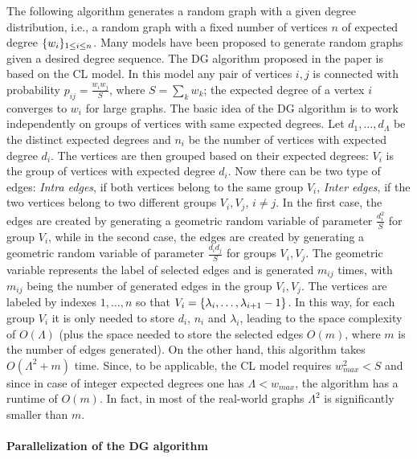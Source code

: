 \documentclass[a4paper,11pt]{article}
\theoremstyle{definition}
\theoremstyle{plain}
\theoremstyle{remark}
\DeclarePairedDelimiter{\bra}{\lbrace}{\rbrace}
\begin{document}
The following algorithm generates a random graph with a given degree distribution, i.e., a random graph with a fixed number of vertices $n$ of expected degree $\bra{w_i}_{1\leq i\leq n}$. Many models have been proposed to generate random graphs given a desired degree sequence. The DG algorithm proposed in the paper \cite{alam:random} is based on the CL model. In this model any pair of vertices $i,j$ is connected with probability $p_{ij}=\frac{w_iw_j}{S}$, where $S=\sum_kw_k$; the expected degree of a vertex $i$ converges to $w_i$ for large graphs.
The basic idea of the DG algorithm is to work independently on groups of vertices with same expected degrees. Let $d_1,\dots,d_\Lambda$ be the distinct expected degrees and $n_i$ be the number of vertices with expected degree $d_i$. The vertices are then grouped based on their expected degrees: $V_i$ is the group of vertices with expected degree $d_i$. Now there can be two type of edges: \emph{Intra edges}, if both vertices belong to the same group $V_i$, \emph{Inter edges}, if the two vertices belong to two different groups $V_i,V_j$, $i\neq j$.  
In the first case, the edges are created by generating a geometric random variable of parameter $\frac{d_i^2}{S}$ for group $V_i$, while in the second case, the edges are created by generating a geometric random variable of parameter $\frac{d_id_j}{S}$ for groups $V_i, V_j$. The geometric variable represents the label of selected edges and is generated $m_{ij}$ times, with $m_{ij}$ being the number of generated edges in the group $V_i, V_j$. The vertices are labeled by indexes $1,\dots,n$ so that $V_i=\bra{\lambda_i,\dots,\lambda_{i+1}-1}$. In this way, for each group $V_i$ it is only needed to store $d_i$, $n_i$ and $\lambda_i$, leading to the space complexity of $O(\Lambda)$ (plus the space needed to store the selected edges $O(m)$, where $m$ is the number of edges generated). On the other hand, this algorithm takes $O(\Lambda^2+m)$ time. Since, to be applicable, the CL model requires $w_{max}^2<S$ and since in case of integer expected degrees one has $\Lambda < w_{max}$, the algorithm has a runtime of $O(m)$. In fact, in most of the real-world graphs $\Lambda^2$ is significantly smaller than $m$.

\paragraph*{Parallelization of the DG algorithm}
\end{document}
